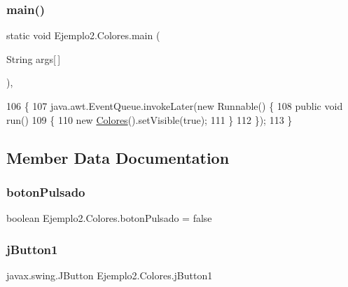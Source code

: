 \subsubsection{\texorpdfstring{main()}{main()}}
{\footnotesize\ttfamily static void Ejemplo2.\+Colores.\+main (\begin{DoxyParamCaption}\item[{String}]{args\mbox{[}$\,$\mbox{]} }\end{DoxyParamCaption})\hspace{0.3cm}{\ttfamily [inline]}, {\ttfamily [static]}}


\begin{DoxyCode}
106     \{
107         java.awt.EventQueue.invokeLater(\textcolor{keyword}{new} Runnable() \{
108             \textcolor{keyword}{public} \textcolor{keywordtype}{void} run()
109             \{
110                 \textcolor{keyword}{new} \mbox{\hyperlink{class_ejemplo2_1_1_colores_a37a221b0ca2fb16d86981345c9a8f2d4}{Colores}}().setVisible(\textcolor{keyword}{true});
111             \}
112         \});
113     \}
\end{DoxyCode}


\subsection{Member Data Documentation}
\mbox{\label{class_ejemplo2_1_1_colores_a9e166190bfd45aea03b8c118cc6c47fb}} 
\subsubsection{\texorpdfstring{boton\+Pulsado}{botonPulsado}}
{\footnotesize\ttfamily boolean Ejemplo2.\+Colores.\+boton\+Pulsado = false\hspace{0.3cm}{\ttfamily [private]}}

\mbox{\label{class_ejemplo2_1_1_colores_a42bfb6444d7ec536cc713e227d90e1ba}} 
\subsubsection{\texorpdfstring{j\+Button1}{jButton1}}
{\footnotesize\ttfamily javax.\+swing.\+J\+Button Ejemplo2.\+Colores.\+j\+Button1\hspace{0.3cm}{\ttfamily [private]}}

